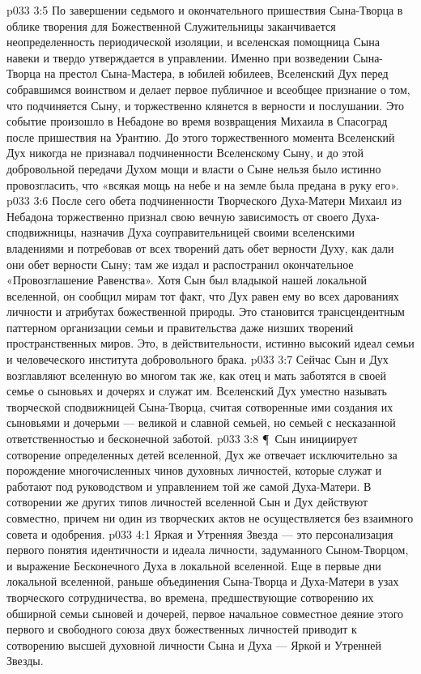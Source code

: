 \vs p033 3:5 По завершении седьмого и окончательного пришествия Сына\hyp{}Творца в облике творения для Божественной Служительницы заканчивается неопределенность периодической изоляции, и вселенская помощница Сына навеки и твердо утверждается в управлении. Именно при возведении Сына\hyp{}Творца на престол Сына\hyp{}Мастера, в юбилей юбилеев, Вселенский Дух перед собравшимся воинством и делает первое публичное и всеобщее признание о том, что подчиняется Сыну, и торжественно клянется в верности и послушании. Это событие произошло в Небадоне во время возвращения Михаила в Спасоград после пришествия на Урантию. До этого торжественного момента Вселенский Дух никогда не признавал подчиненности Вселенскому Сыну, и до этой добровольной передачи Духом мощи и власти о Сыне нельзя было истинно провозгласить, что «всякая мощь на небе и на земле была предана в руку его».
\vs p033 3:6 После сего обета подчиненности Творческого Духа\hyp{}Матери Михаил из Небадона торжественно признал свою вечную зависимость от своего Духа\hyp{}сподвижницы, назначив Духа соуправительницей своими вселенскими владениями и потребовав от всех творений дать обет верности Духу, как дали они обет верности Сыну; там же издал и распостранил окончательное «Провозглашение Равенства». Хотя Сын был владыкой нашей локальной вселенной, он сообщил мирам тот факт, что Дух равен ему во всех дарованиях личности и атрибутах божественной природы. Это становится трансцендентным паттерном организации семьи и правительства даже низших творений пространственных миров. Это, в действительности, истинно высокий идеал семьи и человеческого института добровольного брака.
\vs p033 3:7 Сейчас Сын и Дух возглавляют вселенную во многом так же, как отец и мать заботятся в своей семье о сыновьях и дочерях и служат им. Вселенский Дух уместно называть творческой сподвижницей Сына\hyp{}Творца, считая сотворенные ими создания их сыновьями и дочерьми --- великой и славной семьей, но семьей с несказанной ответственностью и бесконечной заботой.
\vs p033 3:8 \P\ Сын инициирует сотворение определенных детей вселенной, Дух же отвечает исключительно за порождение многочисленных чинов духовных личностей, которые служат и работают под руководством и управлением той же самой Духа\hyp{}Матери. В сотворении же других типов личностей вселенной Сын и Дух действуют совместно, причем ни один из творческих актов не осуществляется без взаимного совета и одобрения.
\vs p033 4:1 Яркая и Утренняя Звезда --- это персонализация первого понятия идентичности и идеала личности, задуманного Сыном\hyp{}Творцом, и выражение Бесконечного Духа в локальной вселенной. Еще в первые дни локальной вселенной, раньше объединения Сына\hyp{}Творца и Духа\hyp{}Матери в узах творческого сотрудничества, во времена, предшествующие сотворению их обширной семьи сыновей и дочерей, первое начальное совместное деяние этого первого и свободного союза двух божественных личностей приводит к сотворению высшей духовной личности Сына и Духа --- Яркой и Утренней Звезды.
